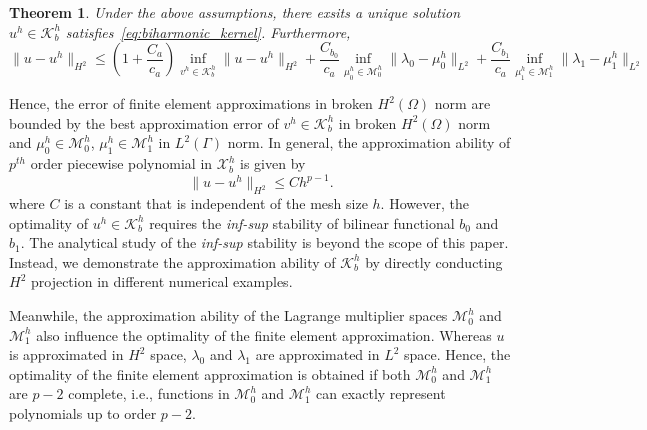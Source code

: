 \documentclass[preprint,12pt]{elsarticle}
\newtheorem{theorem}{Theorem}
\begin{document}
\begin{theorem}
    Under the above assumptions, there exsits a unique solution $u^h\in{\mathcal{K}_b^h}$ satisfies~\eqref{eq:biharmonic_kernel}. Furthermore, 
    \begin{equation}
        \|u-u^h\|_{H^2}\leq{\left(1+\frac{C_a}{c_a}\right)}\inf_{v^h\in{\mathcal{K}_b^h}}\|u-u^h\|_{H^2}+\frac{C_{b_0}}{c_a}\inf_{\mu_0^h\in{\mathcal{M}_0^h}}\|\lambda_0-\mu_0^h\|_{L^2}+\frac{C_{b_1}}{c_a}\inf_{\mu_1^h\in{\mathcal{M}_1^h}}\|\lambda_1-\mu_1^h\|_{L^2}
    \end{equation}
\end{theorem}
Hence, the error of finite element approximations in broken $H^2(\Omega)$ norm are bounded by the best approximation error of $v^h\in{\mathcal{K}_b^h}$ in broken $H^2(\Omega)$ norm and $\mu_0^h\in{\mathcal{M}_0^h}$, $\mu_1^h\in{\mathcal{M}_1^h}$ in $L^2(\Gamma)$ norm. In general, the approximation ability of $p^{th}$ order piecewise polynomial in $\mathcal{X}_b^h$ is given by
\begin{equation}
    \|u-u^h\|_{H^2}\leq{Ch^{p-1}}.
\end{equation}
where $C$ is a constant that is independent of the mesh size $h$. However, the optimality of $u^h\in\mathcal{K}_b^h$ requires the \textit{inf-sup} stability of bilinear functional $b_0$ and $b_1$. The analytical study of the \textit{inf-sup} stability is beyond the scope of this paper. Instead, we demonstrate the approximation ability of $\mathcal{K}_b^h$ by directly conducting $H^2$ projection in different numerical examples.\par

Meanwhile, the approximation ability of the Lagrange multiplier spaces $\mathcal{M}_0^h$ and $\mathcal{M}_1^h$ also influence the optimality of the finite element approximation. Whereas $u$ is approximated in $H^2$ space, $\lambda_0$ and $\lambda_1$ are approximated in $L^2$ space. Hence, the optimality of the finite element approximation is obtained if both $\mathcal{M}_0^h$ and $\mathcal{M}_1^h$ are $p-2$ complete, i.e., functions in $\mathcal{M}_0^h$ and $\mathcal{M}_1^h$ can exactly represent polynomials up to order $p-2$.
\end{document}
